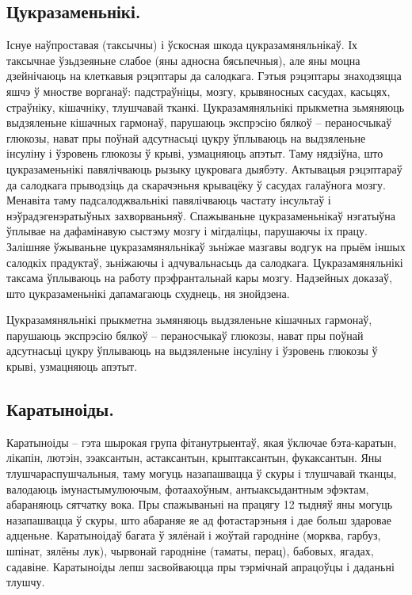 \subsection{Цукразаменьнікі.}
Існуе наўпроставая (таксычны) і ўскосная шкода цукразамяняльнікаў. Іх таксычнае ўзьдзеяньне слабое (яны адносна бясьпечныя), але яны моцна дзейнічаюць на клеткавыя рэцэптары да салодкага. Гэтыя рэцэптары знаходзяцца яшчэ ў мностве ворганаў: падстраўніцы, мозгу, крывяносных сасудах, касьцях, страўніку, кішачніку, тлушчавай тканкі. Цукразамяняльнікі прыкметна зьмяняюць выдзяленьне кішачных гармонаў, парушаюць экспрэсію бялкоў – пераносчыкаў глюкозы, нават пры поўнай адсутнасьці цукру ўплываюць на выдзяленьне інсуліну і ўзровень глюкозы ў крыві, узмацняюць апэтыт. Таму нядзіўна, што цукразаменьнікі павялічваюць рызыку цукровага дыябэту. Актывацыя рэцэптараў да салодкага прыводзіць да скарачэньня крывацёку ў сасудах галаўнога мозгу. Менавіта таму падсалоджвальнікі павялічваюць частату інсультаў і нэўрадэгенэратыўных захворваньняў. Спажываньне цукразаменьнікаў нэгатыўна ўплывае на дафамінавую сыстэму мозгу і мігдаліцы, парушаючы іх працу. Залішняе ўжываньне цукразамяняльнікаў зьніжае мазгавы водгук на прыём іншых салодкіх прадуктаў, зьніжаючы і адчувальнасьць да салодкага. Цукразамяняльнікі таксама ўплываюць на работу прэфрантальнай кары мозгу. Надзейных доказаў, што цукразаменьнікі дапамагаюць схуднець, ня знойдзена.

Цукразамяняльнікі прыкметна зьмяняюць выдзяленьне кішачных гармонаў, парушаюць экспрэсію бялкоў – пераносчыкаў глюкозы, нават пры поўнай адсутнасьці цукру ўплываюць на выдзяленьне інсуліну і ўзровень глюкозы ў крыві, узмацняюць апэтыт.

\subsection{Каратыноіды.}
Каратыноіды – гэта шырокая група фітанутрыентаў, якая ўключае бэта-каратын, лікапін, лютэін, зэаксантын, астаксантын, крыптаксантын, фукаксантын. Яны тлушчараспушчальныя, таму могуць назапашвацца ў скуры і тлушчавай тканцы, валодаюць імунастымулюючым, фотаахоўным, антыаксыдантным эфэктам, абараняюць сятчатку вока. Пры спажываньні на працягу 12 тыдняў яны могуць назапашвацца ў скуры, што абараняе яе ад фотастарэньня і дае больш здаровае адценьне. Каратыноідаў багата ў зялёнай і жоўтай гародніне (морква, гарбуз, шпінат, зялёны лук), чырвонай гародніне (таматы, перац), бабовых, ягадах, садавіне. Каратыноіды лепш засвойваюцца пры тэрмічнай апрацоўцы і даданьні тлушчу.

